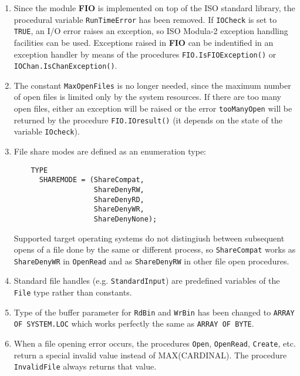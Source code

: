 \begin{enumerate}

\item Since the module {\bf FIO} is implemented on top of the ISO standard library,
      the procedural variable \verb'RunTimeError' has been removed. If \verb'IOCheck'
      is set to \verb'TRUE', an I/O error raises an exception, so ISO Modula-2
      exception handling facilities can be used. Exceptions raised in {\bf FIO}
      can be indentified in an exception handler by means of the procedures
      \verb'FIO.IsFIOException()' or \verb'IOChan.IsChanException()'.

\item The constant \verb'MaxOpenFiles' is no longer needed, since the maximum number of
      open files is limited only by the system resources. If there are
      too many open files, either an exception will be raised or the error
      \verb'tooManyOpen' will be returned by the procedure \verb'FIO.IOresult()'
      (it depends on the state of the variable \verb'IOcheck').

\item File share modes are defined as an enumeration type:

\begin{verbatim}
    TYPE
      SHAREMODE = (ShareCompat,
                   ShareDenyRW,
                   ShareDenyRD,
                   ShareDenyWR,
                   ShareDenyNone);
\end{verbatim}

      Supported target operating systems do not distingiush between subsequent opens
      of a file done by the same or different process, so \verb'ShareCompat' works
      as \verb'ShareDenyWR' in \verb'OpenRead' and as \verb'ShareDenyRW' in other
      file open procedures.

\item Standard file handles (e.g. \verb'StandardInput') are predefined variables of
      the \verb'File' type rather than constants.

\item Type of the buffer parameter for \verb'RdBin' and \verb'WrBin' has been changed to
      \verb'ARRAY OF SYSTEM.LOC' which works perfectly the same as \verb'ARRAY OF BYTE'.

\item When a file opening error occurs, the procedures \verb'Open', \verb'OpenRead',
      \verb'Create', etc. return a special invalid value instead of MAX(CARDINAL).
      The procedure \verb'InvalidFile' always returns that value.


\end{enumerate}
